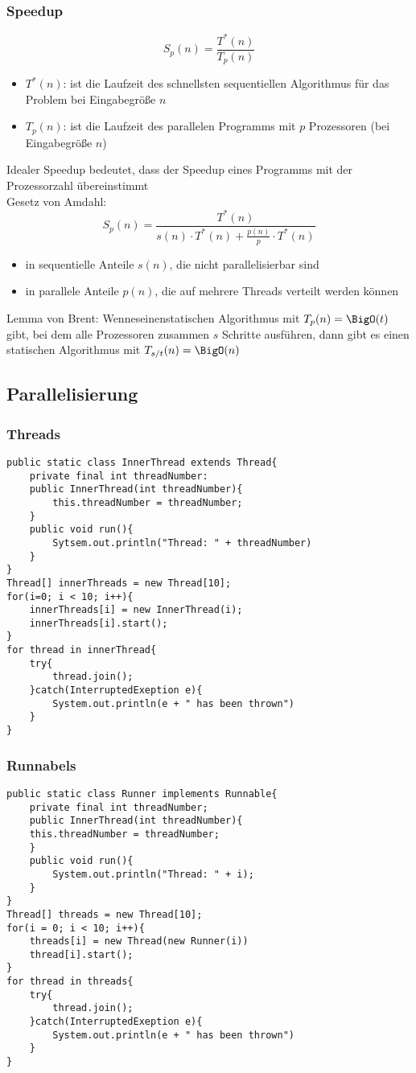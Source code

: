 \subsubsection{Speedup}
$$
	S_p(n)=\frac{T^*(n)}{T_p(n)}
$$
\begin{itemize}
	\item $T^*(n)$: ist die Laufzeit des schnellsten sequentiellen Algorithmus
für das Problem bei Eingabegröße $n$
	\item $T_p(n)$: ist die Laufzeit des parallelen Programms mit $p$
Prozessoren (bei Eingabegröße $n$)
\end{itemize}
Idealer Speedup bedeutet, dass der Speedup eines
Programms mit der Prozessorzahl übereinstimmt \\
Gesetz von Amdahl:
$$
	S_p(n)=\frac{T^*(n)}{s(n)\cdot T^*(n) + \frac{p(n)}{p}\cdot T^*(n)}
$$
\begin{itemize}
	\item in sequentielle Anteile $s(n)$, die nicht parallelisierbar sind
	\item in parallele Anteile $p(n)$, die auf mehrere Threads verteilt werden können
\end{itemize}
Lemma von Brent: Wenneseinenstatischen Algorithmus mit $T_p(n)=\BigO(t)$ gibt, bei dem alle Prozessoren zusammen $s$ Schritte ausführen, dann gibt es einen statischen Algorithmus mit $T_{s/t}(n)=\BigO(n)$
\subsection{Parallelisierung}
\subsubsection{Threads}
\begin{verbatim}
public static class InnerThread extends Thread{
    private final int threadNumber:
    public InnerThread(int threadNumber){
        this.threadNumber = threadNumber;
    }
    public void run(){
        Sytsem.out.println("Thread: " + threadNumber)
    }
}
Thread[] innerThreads = new Thread[10];
for(i=0; i < 10; i++){
    innerThreads[i] = new InnerThread(i);
    innerThreads[i].start();
}
for thread in innerThread{
    try{
        thread.join();
    }catch(InterruptedExeption e){
        System.out.println(e + " has been thrown")
    }
}
\end{verbatim}
\subsubsection{Runnabels}
\begin{verbatim}
public static class Runner implements Runnable{
    private final int threadNumber;
    public InnerThread(int threadNumber){
    this.threadNumber = threadNumber;
    }
    public void run(){
        System.out.println("Thread: " + i);
    }
}
Thread[] threads = new Thread[10];
for(i = 0; i < 10; i++){
    threads[i] = new Thread(new Runner(i))
    thread[i].start();
}
for thread in threads{
    try{
        thread.join();
    }catch(InterruptedExeption e){
        System.out.println(e + " has been thrown")
    }
}
\end{verbatim}
